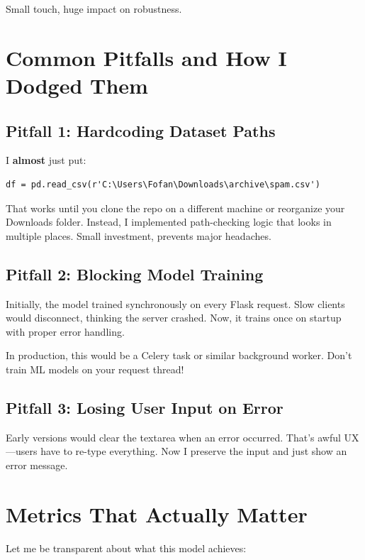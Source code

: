 \documentclass[12pt, a4paper]{article}
\begin{document}
Small touch, huge impact on robustness.

\section{Common Pitfalls and How I Dodged Them}

\subsection{Pitfall 1: Hardcoding Dataset Paths}

I \textbf{almost} just put:

\begin{verbatim}
df = pd.read_csv(r'C:\Users\Fofan\Downloads\archive\spam.csv')
\end{verbatim}

That works until you clone the repo on a different machine or reorganize your Downloads folder. Instead, I implemented path-checking logic that looks in multiple places. Small investment, prevents major headaches.

\subsection{Pitfall 2: Blocking Model Training}

Initially, the model trained synchronously on every Flask request. Slow clients would disconnect, thinking the server crashed. Now, it trains once on startup with proper error handling.

\begin{techdetail}
    In production, this would be a Celery task or similar background worker. Don't train ML models on your request thread!
\end{techdetail}

\subsection{Pitfall 3: Losing User Input on Error}

Early versions would clear the textarea when an error occurred. That's awful UX---users have to re-type everything. Now I preserve the input and just show an error message.

\section{Metrics That Actually Matter}

Let me be transparent about what this model achieves:
\end{document}
